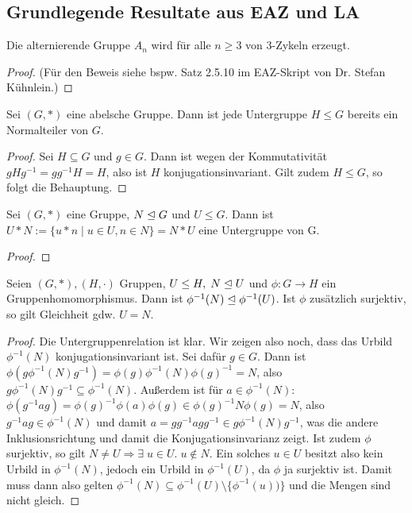 \documentclass[../main.tex]{subfiles}
\begin{document}
\subsection{Grundlegende Resultate aus EAZ und LA}

\begin{lemma}\label{lem:found:0}
    \TODO
\end{lemma}

\begin{lemma}\label{lem:found:1}
Die alternierende Gruppe $A_n$ wird für alle $n \geq 3$ von 3-Zykeln erzeugt.
\end{lemma}
    \begin{proof}
        (Für den Beweis siehe bspw. Satz 2.5.10 im EAZ-Skript von Dr. Stefan Kühnlein.)
    \end{proof}
    
\begin{lemma}\label{lem:found:2}
Sei $(G,*)$ eine abelsche Gruppe. Dann ist jede Untergruppe $H \leq G$ bereits ein Normalteiler von $G$.
\end{lemma}
\begin{proof}
    Sei $H \subseteq G$ und $g \in G$. Dann ist wegen der Kommutativität $gHg^{-1} = gg^{-1}H = H$, also ist $H$ konjugationsinvariant. Gilt zudem $H \leq G$, so folgt die Behauptung.
\end{proof}
    
\begin{lemma}\label{lem:found:3}
    Sei $(G,*)$ eine Gruppe, $N \trianglelefteq G$ und $U \leq G$. Dann ist $U*N := \{u*n \mid u \in U, n \in N\} = N*U$ eine Untergruppe von G.
\end{lemma}
\begin{proof}
    \TODO
\end{proof}
    
\begin{lemma}\label{lem:found:4}
    Seien $(G,*), (H,\cdot)$ Gruppen, $U \leq H, \; N \trianglelefteq U$ und $\phi: G \rightarrow H$ ein Gruppenhomomorphismus. Dann ist $\phi^{-1}(N) \trianglelefteq \phi^{-1}(U)$. Ist $\phi$ zusätzlich surjektiv, so gilt Gleichheit gdw. $U = N$.
\end{lemma}
\begin{proof} 
    Die Untergruppenrelation ist klar. Wir zeigen also noch, dass das Urbild $\phi^{-1}(N)$ konjugationsinvariant ist. Sei dafür $g \in G$. Dann ist $\phi(g\phi^{-1}(N)g^{-1}) = \phi(g)\phi^{-1}(N)\phi(g)^{-1} = N$, also $g\phi^{-1}(N)g^{-1} \subseteq \phi^{-1}(N)$. Außerdem ist für $a \in \phi^{-1}(N)$: $\phi(g^{-1}ag) = \phi(g)^{-1}\phi(a)\phi(g) \in \phi(g)^{-1}N\phi(g) = N$, also $g^{-1}ag \in \phi^{-1}(N)$ und damit $a = gg^{-1}agg^{-1} \in g\phi^{-1}(N)g^{-1}$, was die andere Inklusionsrichtung und damit die Konjugationsinvarianz zeigt.
    Ist zudem $\phi$ surjektiv, so gilt $N \neq U \Rightarrow \exists \; u \in U. \; u \notin N$. Ein solches $u \in U$ besitzt also kein Urbild in $\phi^{-1}(N)$, jedoch ein Urbild in $\phi^{-1}(U)$, da $\phi$ ja surjektiv ist. Damit muss dann also gelten $\phi^{-1}(N) \subseteq \phi^{-1}(U)\setminus\{\phi^{-1}(u))\}$ und die Mengen sind nicht gleich.
\end{proof}
    
\end{document}
